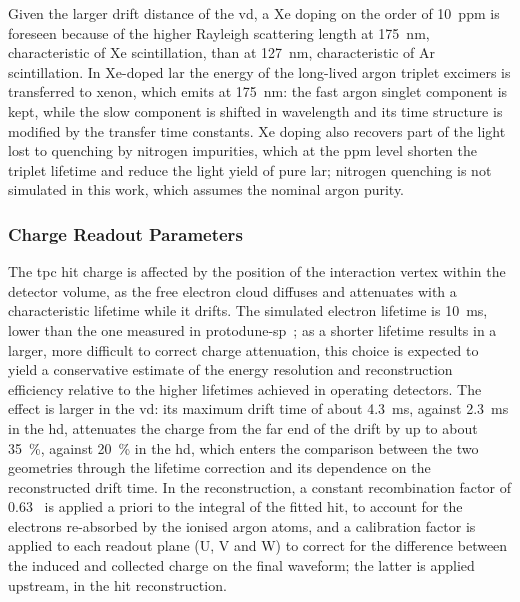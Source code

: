 Given the larger drift distance of the \gls{vd}, a Xe doping on the order of 10~ppm is foreseen because of the higher Rayleigh scattering length at \SI{175}{\nano\meter}, characteristic of Xe scintillation, than at \SI{127}{\nano\meter}, characteristic of Ar scintillation. In Xe-doped \gls{lar} the energy of the long-lived argon triplet excimers is transferred to xenon, which emits at \SI{175}{\nano\meter}: the fast argon singlet component is kept, while the slow component is shifted in wavelength and its time structure is modified by the transfer time constants. Xe doping also recovers part of the light lost to quenching by nitrogen impurities, which at the ppm level shorten the triplet lifetime and reduce the light yield of pure \gls{lar}; nitrogen quenching is not simulated in this work, which assumes the nominal argon purity.

\subsubsection{Charge Readout Parameters}\label{sec:SIM_CHARGE_PARAMETERS}
The \gls{tpc} hit charge is affected by the position of the interaction vertex within the detector volume, as the free electron cloud diffuses and attenuates with a characteristic lifetime while it drifts. The simulated electron lifetime is \SI{10}{\milli\second}, lower than the one measured in \gls{protodune-sp}~\cite{DUNE:2020cqd}; as a shorter lifetime results in a larger, more difficult to correct charge attenuation, this choice is expected to yield a conservative estimate of the energy resolution and reconstruction efficiency relative to the higher lifetimes achieved in operating detectors. The effect is larger in the \gls{vd}: its maximum drift time of about \SI{4.3}{\milli\second}, against \SI{2.3}{\milli\second} in the \gls{hd}, attenuates the charge from the far end of the drift by up to about \SI{35}{\percent}, against \SI{20}{\percent} in the \gls{hd}, which enters the comparison between the two geometries through the lifetime correction and its dependence on the reconstructed drift time. In the reconstruction, a constant recombination factor of 0.63~\cite{abi2020deep} is applied a priori to the integral of the fitted hit, to account for the electrons re-absorbed by the ionised argon atoms, and a calibration factor is applied to each readout plane (U, V and W) to correct for the difference between the induced and collected charge on the final waveform; the latter is applied upstream, in the hit reconstruction.
